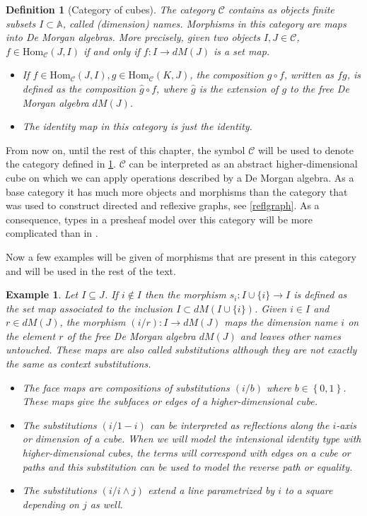 \documentclass[11pt,a4paper,twoside,xetex,draft]{book}
\newcommand{\keyword}[1]{\emph{#1}\index{#1}}
\newtheorem{definition}[theorem]{Definition}
\newtheorem{example}[theorem]{Example}
\newcommand{\homo}[3]{\text{Hom}_{#1}\left(#2,#3\right)}
\begin{document}
\begin{definition}[Category of cubes]\label{cubcat}
  The category $\mathcal{C}$ contains as objects finite subsets $I \subset \mathbb{A}$, called (dimension) names. Morphisms in this category are maps into De Morgan algebras. More precisely, given two objects $I,J \in \mathcal{C}$, $f \in \text{Hom}_{\mathcal{C}}(J,I)$ if and only if $f: I \rightarrow dM(J)$ is a set map.
  \begin{itemize}
  \item  If $f \in \homo{\mathcal{C}}{J}{I}, g \in \homo{\mathcal{C}}{K}{J}$, the composition $g \circ f$, written as $fg$, is defined as the composition  $\hat{g} \circ f$, where $\hat{g}$ is the extension of $g$ to the free De Morgan algebra $dM(J)$.
    \item The identity map in this category is just the identity.
\end{itemize}
    \end{definition}

From now on, until the rest of this chapter, the symbol $\mathcal{C}$ will be used to denote the category defined in \cref{cubcat}. $\mathcal{C}$ can be interpreted as an abstract higher-dimensional cube on which we can apply operations described by a De Morgan algebra. As a base category it has much more objects and morphisms than the category that was used to construct directed and reflexive graphs, see \cref{reflgraph}. As a consequence, types in a presheaf model over this category will be more complicated than in \label{depgraph}.

Now a few examples will be given of morphisms that are present in this category and will be used in the rest of the text.

\begin{example}
Let $I \subseteq J$. If $i \not \in I$ then the morphism $s_i : I \cup \{i\} \rightarrow I$ is defined as the set map associated to the inclusion $I \subset dM(I\cup \{i \})$.  Given $i \in I$ and $r \in dM(J)$, the morphism $(i/r): I \rightarrow dM(J) $ maps the dimension name $i$ on the element $r$ of the free De Morgan algebra $dM(J)$ and leaves other names untouched. These maps are also called \keyword{substitutions} although they are not exactly the same as context substitutions. 
\begin{itemize}
\item The \keyword{face maps} are compositions of substitutions $(i/b)$ where $b\in \left\{0,1\right\}$. These maps give the subfaces or edges of a higher-dimensional cube.
\item The substitutions $(i / 1- i)$ can be interpreted as reflections along the $i$-axis or dimension of a cube. When we will model the intensional identity type with higher-dimensional cubes, the terms will correspond with edges on a cube or paths and this substitution can be used to model the reverse path or equality.
\item The substitutions $(i / i \wedge j)$ extend a line parametrized by $i$ to a square depending on $j$ as well.
\end{itemize}

\end{example}
\end{document}
